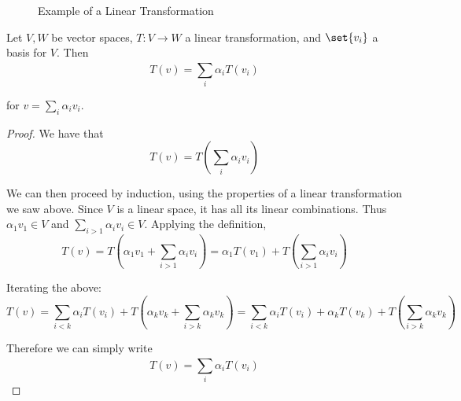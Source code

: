 \documentclass{article}
\begin{document}
\begin{figure}[!ht]
  \centering
  \caption{Example of a Linear Transformation}
  \label{fig:example_of_a_linear_transformation}
\end{figure}

\begin{theorem}
  Let $V, W$ be vector spaces, $T: V \to W$ a linear transformation, and $\set{v_i}$ a basis for $V$. Then
  \[
    T(v) = \sum^{}_{i} \alpha_i T(v_i)
  \]

  for $v = \sum^{}_{i} \alpha_i v_i$.
\end{theorem}

\begin{proof}
  We have that
  \[
    T(v) = T\left(\sum^{}_{i} \alpha_i v_i\right)
  \]

  We can then proceed by induction, using the properties of a linear transformation we saw above. Since $V$ is a linear space, it has all its  linear combinations. Thus $\alpha_1 v_1 \in V$ and $\sum^{}_{i > 1} \alpha_i v_i \in V$. Applying the definition,
  \[
    T(v)
    =
    T\left(\alpha_1 v_1 + \sum^{}_{i > 1} \alpha_i v_i\right)
    =
    \alpha_1 T\left(v_1\right) + T\left(\sum^{}_{i > 1} \alpha_i v_i\right)
  \]

  Iterating the above:
  \[
    T(v)
    =
    \sum^{}_{i < k}
    \alpha_i T\left(v_i\right)
    +
    T\left(\alpha_k v_k + \sum^{}_{i > k} \alpha_k v_k\right)
    =
    \sum^{}_{i < k}
    \alpha_i T\left(v_i\right)
    +
    \alpha_k T(v_k)
    +
    T\left(\sum^{}_{i > k} \alpha_k v_k\right)
  \]

  Therefore we can simply write
  \[
    T(v) = \sum^{}_{i} \alpha_i T\left(v_i\right)
  \]
\end{proof}
\end{document}
